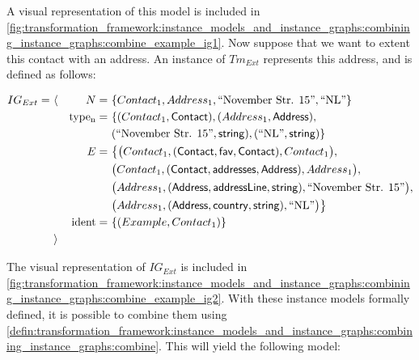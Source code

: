 A visual representation of this model is included in \cref{fig:transformation_framework:instance_models_and_instance_graphs:combining_instance_graphs:combine_example_ig1}. Now suppose that we want to extent this contact with an address. An instance of $Tm_{Ext}$ represents this address, and is defined as follows:

\begin{align*}
IG_{Ext} =\ &\langle&
N =\ &\{ Contact_1, Address_1, \text{``November Str. 15''}, \text{``NL''} \} \\&&
\mathrm{type_{n}} =\ &\{
( Contact_1, \mathsf{Contact} ),
( Address_1, \mathsf{Address} ),\\&&&
( \text{``November Str. 15''}, \mathsf{string} ),
( \text{``NL''} , \mathsf{string} )
\} \\&&
E =\ &\big\{
\big( Contact_1, ( \mathsf{Contact}, \mathsf{fav}, \mathsf{Contact} ), Contact_1 \big),\\&&&
\big( Contact_1, ( \mathsf{Contact}, \mathsf{addresses}, \mathsf{Address} ), Address_1 \big),\\&&&
\big( Address_1, ( \mathsf{Address}, \mathsf{addressLine}, \mathsf{string} ), \text{``November Str. 15''} \big),\\&&&
\big( Address_1, ( \mathsf{Address}, \mathsf{country}, \mathsf{string} ), \text{``NL''} \big)
\big\} \\&&
\mathrm{ident} =\ &\{
( Example, Contact_1 )
\}
\\&\rangle
\end{align*}

The visual representation of $IG_{Ext}$ is included in \cref{fig:transformation_framework:instance_models_and_instance_graphs:combining_instance_graphs:combine_example_ig2}. With these instance models formally defined, it is possible to combine them using \cref{defin:transformation_framework:instance_models_and_instance_graphs:combining_instance_graphs:combine}. This will yield the following model:

